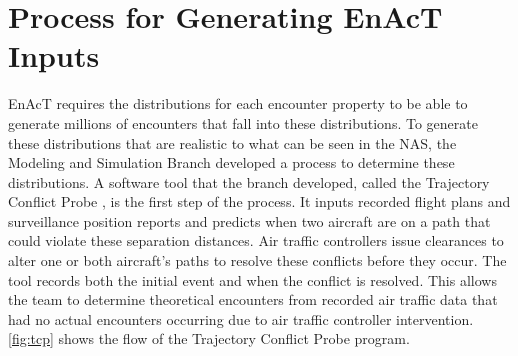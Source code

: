 \chapter{Process for Generating EnAcT Inputs}

EnAcT requires the distributions for each encounter property to be able to generate millions of encounters that fall into these distributions. To generate these distributions that are realistic to what can be seen in the NAS, the Modeling and Simulation Branch developed a process to determine these distributions. A software tool that the branch developed, called the Trajectory Conflict Probe \cite{paglione:2008}, is the first step of the process. It inputs recorded flight plans and surveillance position reports and predicts when two aircraft are on a path that could violate these separation distances. Air traffic controllers issue clearances to alter one or both aircraft’s paths to resolve these conflicts before they occur. The tool records both the initial event and when the conflict is resolved. This allows the team to determine theoretical encounters from recorded air traffic data that had no actual encounters occurring due to air traffic controller intervention. \ref{fig:tcp} shows the flow of the Trajectory Conflict Probe program. 


